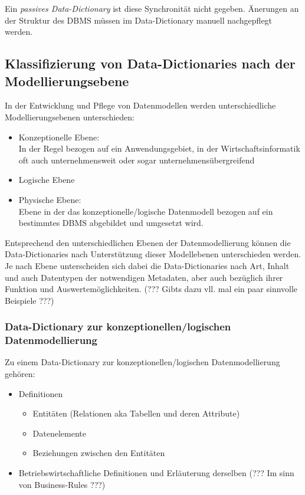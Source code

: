 \documentclass{scrbook}
\begin{document}
Ein \emph{passives Data-Dictionary} ist diese Synchronität nicht gegeben.
Änerungen an der Struktur des DBMS müssen im Data-Dictionary manuell nachgepflegt werden.




\subsection{Klassifizierung von Data-Dictionaries nach der Modellierungsebene}

In der Entwicklung und Pflege von Datenmodellen werden unterschiedliche Modellierungsebenen unterschieden:
\begin{itemize}
\item Konzeptionelle Ebene:\\
	In der Regel bezogen auf ein Anwendungsgebiet, in der Wirtschaftsinformatik oft 
	auch unternehmensweit oder sogar unternehmensübergreifend
\item Logische Ebene
\item Physische Ebene:\\
	Ebene in der das konzeptionelle/logische Datenmodell bezogen auf ein bestimmtes DBMS
	abgebildet und umgesetzt wird.
\end{itemize}

Entsprechend den unterschiedlichen Ebenen der Datenmodellierung können die Data-Dictionaries
nach Unterstützung dieser Modellebenen unterschieden werden.
Je nach Ebene unterscheiden sich dabei die Data-Dictionaries nach Art, Inhalt und auch
Datentypen der notwendigen Metadaten,
aber auch bezüglich ihrer Funktion und Auswertemöglichkeiten.
(??? Gibts dazu vll. mal ein paar sinnvolle Beispiele ???)


\subsubsection{Data-Dictionary zur konzeptionellen/logischen Datenmodellierung}

Zu einem Data-Dictionary zur konzeptionellen/logischen Datenmodellierung gehören:
\begin{itemize}
\item Definitionen
	\begin{itemize}
	\item Entitäten (Relationen aka Tabellen und deren Attribute)
	\item Datenelemente
	\item Beziehungen zwischen den Entitäten
	\end{itemize}
\item Betriebswirtschaftliche Definitionen und Erläuterung derselben (??? Im sinn von Business-Rules ???) 
\end{itemize}
\end{document}
